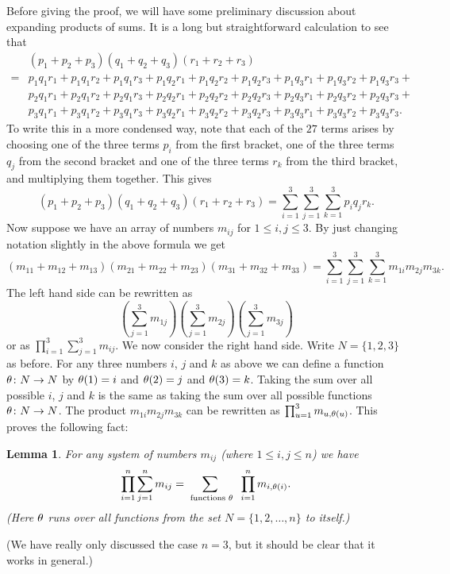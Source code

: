\documentclass[reqno]{amsart}
\newtheorem{lemma}[theorem]{Lemma}
\theoremstyle{definition}
\begin{document}
Before giving the proof, we will have some preliminary discussion
about expanding products of sums.  It is a long but straightforward
calculation to see that
\begin{align*}
 & (p_1+p_2+p_3)(q_1+q_2+q_3)(r_1+r_2+r_3) \\
 =& p_1q_1r_1+p_1q_1r_2+p_1q_1r_3+
    p_1q_2r_1+p_1q_2r_2+p_1q_2r_3+
    p_1q_3r_1+p_1q_3r_2+p_1q_3r_3+ \\
  & p_2q_1r_1+p_2q_1r_2+p_2q_1r_3+
    p_2q_2r_1+p_2q_2r_2+p_2q_2r_3+
    p_2q_3r_1+p_2q_3r_2+p_2q_3r_3+ \\
  & p_3q_1r_1+p_3q_1r_2+p_3q_1r_3+
    p_3q_2r_1+p_3q_2r_2+p_3q_2r_3+
    p_3q_3r_1+p_3q_3r_2+p_3q_3r_3.
\end{align*}
To write this in a more condensed way, note that each of the $27$
terms arises by choosing one of the three terms $p_i$ from the first
bracket, one of the three terms $q_j$ from the second bracket and one
of the three terms $r_k$ from the third bracket, and multiplying them
together.  This gives
\[ (p_1+p_2+p_3)(q_1+q_2+q_3)(r_1+r_2+r_3) =
    \sum_{i=1}^3\sum_{j=1}^3\sum_{k=1}^3 p_iq_jr_k.
\]
Now suppose we have an array of numbers $m_{ij}$ for
$1\leq i,j\leq 3$.  By just changing notation slightly in the above
formula we get
\[ (m_{11}+m_{12}+m_{13})(m_{21}+m_{22}+m_{23})(m_{31}+m_{32}+m_{33})
    =
    \sum_{i=1}^3\sum_{j=1}^3\sum_{k=1}^3 m_{1i} m_{2j} m_{3k}.
\]
The left hand side can be rewritten as
\[ \left(\sum_{j=1}^3m_{1j}\right)
   \left(\sum_{j=1}^3m_{2j}\right)
   \left(\sum_{j=1}^3m_{3j}\right)
\]
or as $\prod_{i=1}^3\sum_{j=1}^3m_{ij}$.  We now consider the right
hand side.  Write $N=\{1,2,3\}$ as before.  For any three numbers $i$,
$j$ and $k$ as above we can define a function $\theta\colon N\to N$ by
$\theta(1)=i$ and $\theta(2)=j$ and $\theta(3)=k$.  Taking the sum over all
possible $i$, $j$ and $k$ is the same as taking the sum over all
possible functions $\theta\colon N\to N$.  The product $m_{1i}m_{2j}m_{3k}$
can be rewritten as $\prod_{u=1}^3m_{u,\theta(u)}$.  This proves the
following fact:
\begin{lemma}\label{lem-expand}
 For any system of numbers $m_{ij}$ (where $1\leq i,j\leq n$) we have
 \[ \prod_{i=1}^n \sum_{j=1}^n m_{ij} =
     \sum_{\text{ functions } \theta} \; \; \prod_{i=1}^n m_{i,\theta(i)}.
 \]
 (Here $\theta$ runs over all functions from the set
 $N=\{1,2,\dotsc,n\}$ to itself.)
\end{lemma}
(We have really only discussed the case $n=3$, but it should be clear
that it works in general.)
\end{document}
